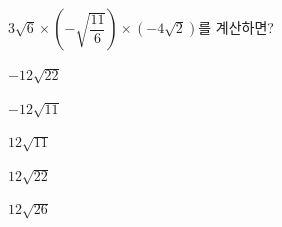 $3\sqrt{6}\times\left(-\sqrt{\dfrac{11}{6}}\right)\times(-4\sqrt{2})$를 계산하면?
\begin{choices32}{\rule[-3ex]{0pt}{8ex}$-12\sqrt{22}$}{\rule[-3ex]{0pt}{8ex}$-12\sqrt{11}$}{\rule[-3ex]{0pt}{8ex}$12\sqrt{11}$}{\rule[-3ex]{0pt}{8ex}$12\sqrt{22}$}{\rule[-3ex]{0pt}{8ex}$12\sqrt{26}$}\end{choices32}
